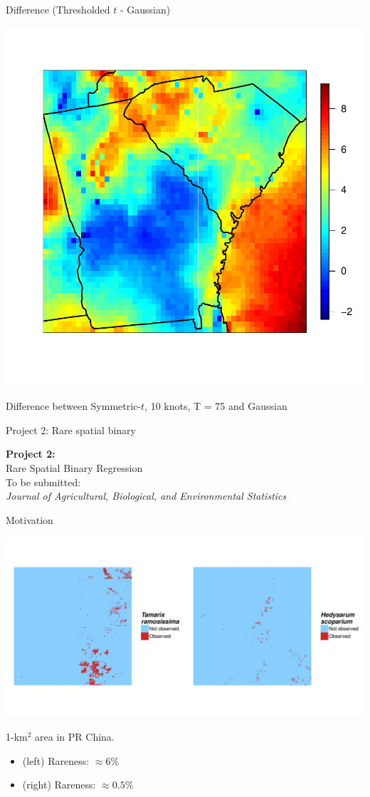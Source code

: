 \documentclass{beamer}
\begin{document}
 \begin{frame}{Difference (Thresholded $t$ - Gaussian)}
 	\begin{center}
 		\includegraphics[width=0.45\linewidth]{q99diffgausskewt}

 		Difference between Symmetric-$t$, 10 knots, T = 75 and Gaussian
 	\end{center}
 \end{frame}

\begin{frame}{Project 2: Rare spatial binary}
	\begin{center}
		\LARGE
		\textbf{Project 2:}\\ [1em]
		Rare Spatial Binary Regression\\[2em]
		\normalsize
		To be submitted:\\
		\emph{Journal of Agricultural, Biological, and Environmental Statistics}
	\end{center}
\end{frame}

\begin{frame}{Motivation}
	\begin{center}
		\vspace{-3em}
		\includegraphics[width = 0.9\linewidth]{plant-census}
		\vspace{-1em}

		1-km$^2$ area in PR China.
	\end{center}
	\begin{itemize} \setlength{\itemsep}{0.5em}
		\item \tamarix{} (left) Rareness: $\approx 6\%$
		\item \hedysarum{} (right) Rareness: $\approx 0.5\%$
	\end{itemize}
\end{frame}
\end{document}
